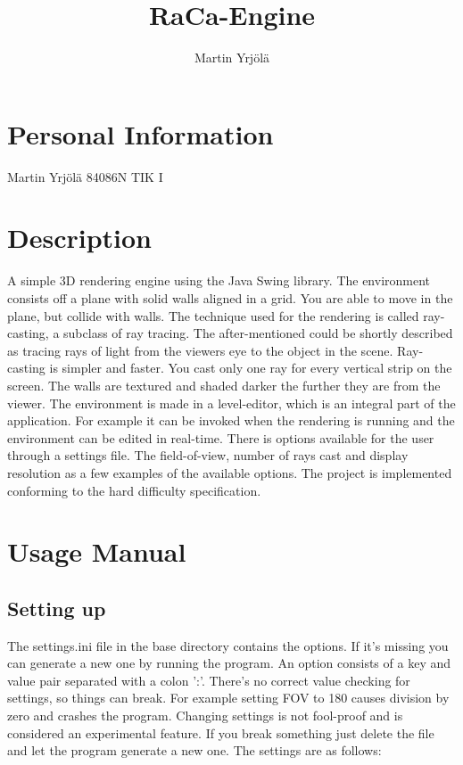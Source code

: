 \documentclass[a4paper,10pt]{article}
\title{RaCa-Engine}
\author{Martin Yrjölä}
\begin{document}
\maketitle

\section{Personal Information}

Martin Yrjölä\newline
84086N\newline
TIK I\newline

\section{Description}

A simple 3D rendering engine using the Java Swing library. The environment
consists off a plane with solid walls aligned in a grid. You are able to move in
the plane, but collide with walls. The technique used for the rendering is
called ray-casting, a subclass of ray tracing. The after-mentioned could be
shortly described as tracing rays of light from the viewers eye to the object in
the scene. Ray-casting is simpler and faster. You cast only one ray for every
vertical strip on the screen. The walls are textured and shaded darker the
further they are from the viewer. The environment is made in a level-editor,
which is an integral part of the application. For example it can be
invoked when the rendering is running and the environment can be edited in
real-time. There is options available for the user through a settings file. The
field-of-view, number of rays cast and display resolution as a few examples of
the available options. The project is implemented conforming to the hard
difficulty specification.

\section{Usage Manual}

\subsection{Setting up}
The settings.ini file in the base directory contains the options. If it's
missing you can generate a new one by running the program. An option consists
of a key and value pair separated with a colon ':'. There's no correct value
checking for settings, so things can break. For example setting FOV to 180
causes division by zero and crashes the program. Changing settings is not
fool-proof and is considered an experimental feature. If you break something
just delete the file and let the program generate a new one. The settings are as
follows:
\end{document}
